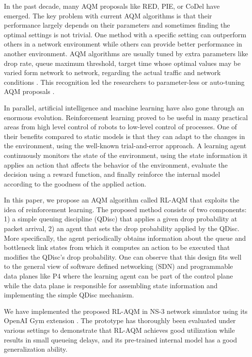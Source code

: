\documentclass[conference]{IEEEtran}
\begin{document}
In the past decade, many AQM proposals like RED, PIE, or CoDel have emerged. The key problem with current AQM algorithms is that their performance largely depends on their parameters and sometimes finding the optimal settings is not trivial. One method with a specific setting can outperform others in a network environment while others can provide better performance in another environment. 
AQM algorithms are  usually tuned by extra parameters like drop rate, queue maximum threshold, target time whose optimal values may be varied form network to network, regarding the actual traffic and network conditions \cite{alwahab2018simulation, kulatunga2015tackling}. 
This recognition led the researchers to  parameter-less or auto-tuning AQM proposals \cite{steeringgsp, rlaqmv1}.

In parallel, artificial intelligence and machine learning have also gone through an enormous evolution. Reinforcement learning proved to be useful in many practical areas from high level control of robots to low-level control of processes. One of their benefits compared to static models is that they can adapt to the changes in the environment, using the well-known trial-and-error approach. A learning agent continuously monitors the state of the environment, using the state information it applies an action that affects the behavior of the environment, evaluate the decision using a reward function, and finally reinforce the internal model according to the goodness of the applied action.

In this paper, we propose an AQM algorithm called RL-AQM that exploits the idea of reinforcement learning. The proposed method consists of two components: 1) a simple queuing discipline (QDisc) that applies a given drop probability at packet arrival, 2) an agent that sets the drop probability applied by the QDisc. More specifically, the agent periodically obtains information about the queue and bottleneck link states from which it computes an action to be executed that modifies the QDisc's drop probability. 
One can observe that this design fits well to the general view of software defined networking (SDN) and programmable data planes like P4 \cite{p4} where the learning agent can be part of the control plane while the data plane is responsible for assembling  state information and implementing the simple QDisc mechanism.

We have implemented the proposed RL-AQM in NS-3 network simulator using its OpenAI Gym extension  \cite{gawlowicz2019ns}. The prototype has thoroughly been evaluated under various settings to demonstrate that RL-AQM achieves good utilization while results in small queueing delays, and its pre-trained internal model has a good generalization ability.
\end{document}
